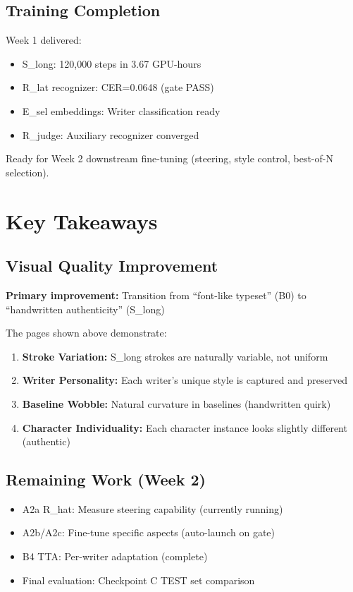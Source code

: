 \documentclass[11pt,a4paper]{article}
\begin{document}
\subsection*{Training Completion}

Week 1 delivered:
\begin{itemize}
  \item S\_long: 120,000 steps in 3.67 GPU-hours
  \item R\_lat recognizer: CER=0.0648 (gate PASS)
  \item E\_sel embeddings: Writer classification ready
  \item R\_judge: Auxiliary recognizer converged
\end{itemize}

Ready for Week 2 downstream fine-tuning (steering, style control, best-of-N selection).

\newpage

\section{Key Takeaways}

\subsection*{Visual Quality Improvement}

\textbf{Primary improvement:} Transition from ``font-like typeset'' (B0) to
``handwritten authenticity'' (S\_long)

The pages shown above demonstrate:
\begin{enumerate}
  \item \textbf{Stroke Variation:} S\_long strokes are naturally variable, not uniform
  \item \textbf{Writer Personality:} Each writer's unique style is captured and preserved
  \item \textbf{Baseline Wobble:} Natural curvature in baselines (handwritten quirk)
  \item \textbf{Character Individuality:} Each character instance looks slightly different (authentic)
\end{enumerate}

\subsection*{Remaining Work (Week 2)}

\begin{itemize}
  \item A2a R\_hat: Measure steering capability (currently running)
  \item A2b/A2c: Fine-tune specific aspects (auto-launch on gate)
  \item B4 TTA: Per-writer adaptation (complete)
  \item Final evaluation: Checkpoint C TEST set comparison
\end{itemize}
\end{document}
